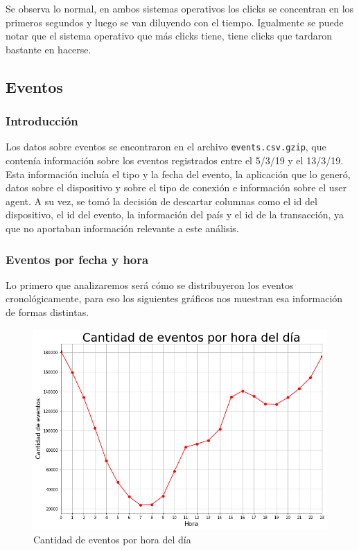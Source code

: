 \documentclass[a4paper, 12pt]{article}
\begin{document}
		 Se observa lo normal, en ambos sistemas operativos los clicks se concentran en los primeros segundos y luego se van diluyendo con el tiempo. Igualmente se puede notar que el sistema operativo que más clicks tiene, tiene clicks que tardaron bastante en hacerse.




		

\clearpage
\subsection{Eventos}
	\subsubsection{Introducción}
		Los datos sobre eventos se encontraron en el archivo \texttt{events.csv.gzip}, que contenía información sobre los eventos registrados entre el 5/3/19 y el 13/3/19. Esta información incluía el tipo y la fecha del evento, la aplicación que lo generó, datos sobre el dispositivo y sobre el tipo de conexión e información sobre el user agent. A su vez, se tomó la decisión de descartar columnas como el id del dispositivo, el id del evento, la información del país y el id de la transacción, ya que no aportaban información relevante a este análisis.
		
	\subsubsection{Eventos por fecha y hora}
		
		Lo primero que analizaremos será cómo se distribuyeron los eventos cronológicamente, para eso los siguientes gráficos nos muestran esa información de formas distintas.
		
		\FloatBarrier
		\begin{figure}[h]
			\centering
			\includegraphics[width=\textwidth]{images/events/eventsxhora.png}
			\caption{Cantidad de eventos por hora del día}
		\end{figure}
		\FloatBarrier
		
\end{document}
